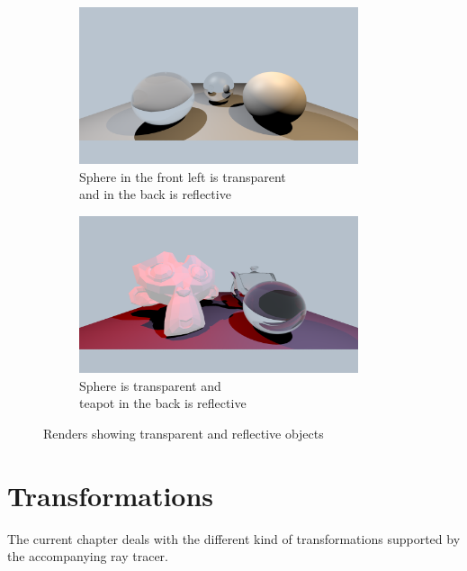 \documentclass{article}
\begin{document}
\begin{figure}[h]
	\centering
	\begin{subfigure}{0.5\textwidth}
		\includegraphics[width=0.9\textwidth]{whitted_example}
		\caption{Sphere in the front left is transparent \\ and in the back is reflective}
		\label{fig:whitted_like}
	\end{subfigure}%
	\hfill
	\begin{subfigure}{0.5\textwidth}
		\includegraphics[width=0.9\textwidth]{scene_with_gamma}
		\caption{Sphere is transparent and \\ teapot in the back is reflective}
		\label{fig:second}
	\end{subfigure}
	
	\caption{Renders showing transparent and reflective objects}
\end{figure}

\newpage


\section{Transformations}
\label{sec:transform}
The current chapter deals with the different kind of transformations supported by the accompanying ray tracer.
\end{document}

